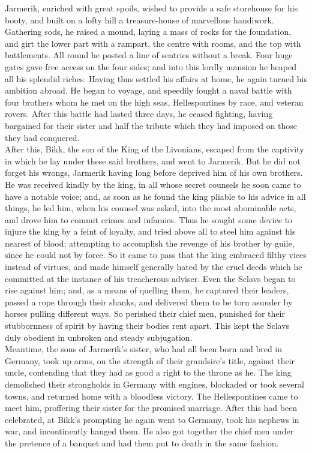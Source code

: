 \documentclass[10pt,a4paper]{report}
\begin{document}
Jarmerik, enriched with great spoils, wished to provide a safe storehouse for his booty, and built on a lofty hill a treasure-house of marvellous handiwork. Gathering sods, he raised a mound, laying a mass of rocks for the foundation, and girt the lower part with a rampart, the centre with rooms, and the top with battlements. All round he posted a line of sentries without a break. Four huge gates gave free access on the four sides; and into this lordly mansion he heaped all his splendid riches. Having thus settled his affairs at home, he again turned his ambition abroad. He began to voyage, and speedily fought a naval battle with four brothers whom he met on the high seas, Hellespontines by race, and veteran rovers. After this battle had lasted three days, he ceased fighting, having bargained for their sister and half the tribute which they had imposed on those they had conquered.\\

After this, Bikk, the son of the King of the Livonians, escaped from the captivity in which he lay under these said brothers, and went to Jarmerik. But he did not forget his wrongs, Jarmerik having long before deprived him of his own brothers. He was received kindly by the king, in all whose secret counsels he soon came to have a notable voice; and, as soon as he found the king pliable to his advice in all things, he led him, when his counsel was asked, into the most abominable acts, and drove him to commit crimes and infamies. Thus he sought some device to injure the king by a feint of loyalty, and tried above all to steel him against his nearest of blood; attempting to accomplish the revenge of his brother by guile, since he could not by force. So it came to pass that the king embraced filthy vices instead of virtues, and made himself generally hated by the cruel deeds which he committed at the instance of his treacherous adviser. Even the Sclavs began to rise against him; and, as a means of quelling them, he captured their leaders, passed a rope through their shanks, and delivered them to be torn asunder by horses pulling different ways. So perished their chief men, punished for their stubbornness of spirit by having their bodies rent apart. This kept the Sclavs duly obedient in unbroken and steady subjugation.\\

Meantime, the sons of Jarmerik's sister, who had all been born and bred in Germany, took up arms, on the strength of their grandsire's title, against their uncle, contending that they had as good a right to the throne as he. The king demolished their strongholds in Germany with engines, blockaded or took several towns, and returned home with a bloodless victory. The Hellespontines came to meet him, proffering their sister for the promised marriage. After this had been celebrated, at Bikk's prompting he again went to Germany, took his nephews in war, and incontinently hanged them. He also got together the chief men under the pretence of a banquet and had them put to death in the same fashion.\\
\end{document}
